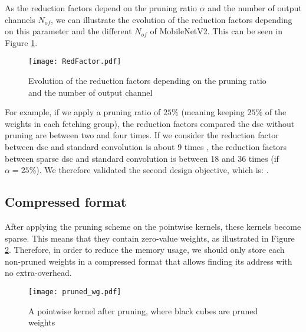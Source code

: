 As the reduction factors depend on the pruning ratio $\alpha$ and the number of output channels $N_{of}$, we can illustrate the evolution of the reduction factors depending on this parameter and the different $N_{of}$ of MobileNetV2. This can be seen in Figure \ref{fig:redfacto}.
%
\begin{figure}[H]
    \centering
    \texttt{[image: RedFactor.pdf]}
    \caption{Evolution of the reduction factors depending on the pruning ratio and the number of output channel}
    \label{fig:redfacto}
\end{figure}

For example, if we apply a pruning ratio of $25\%$ (meaning keeping $25\%$ of the weights in each fetching group), the reduction factors compared the \acrshort{dsc} without pruning are between two and four times. If we consider the reduction factor between \acrshort{dsc} and standard convolution is about 9 times \cite{zhang_channel_2019}, the reduction factors between sparse \acrshort{dsc} and standard convolution is between 18 and 36 times (if $\alpha = 25\%$). We therefore validated the second design objective, which is: \textbf{}.
%
\subsection{Compressed format} \label{subs:compress_f}
%
After applying the pruning scheme on the pointwise kernels, these kernels become sparse. This means that they contain zero-value weights, as illustrated in Figure \ref{fig:pruned_wg}. Therefore, in order to reduce the memory usage, we should only store each non-pruned weights in a compressed format that allows finding its address with no extra-overhead.
%
\begin{figure}[H]
    \centering
    \texttt{[image: pruned\_wg.pdf]}
    \caption{A pointwise kernel after pruning, where black cubes are pruned weights}
    \label{fig:pruned_wg}
\end{figure}


